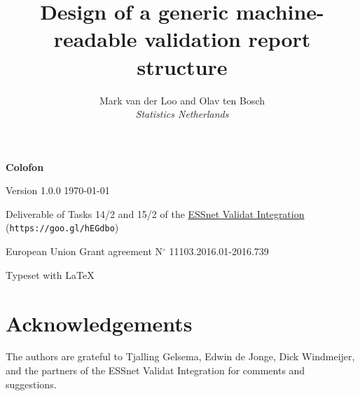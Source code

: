 \documentclass[a4paper, 11pt,titlepage]{article}
\title{Design of a generic machine-readable validation report structure}
\author{Mark van der Loo and Olav ten Bosch\\
\emph{Statistics Netherlands}
}
\date{\version{}\\
\begin{picture}(0,0)
\put(150,350){\texttt{[image: fig/logo\_validat\_integration.png]}}
\end{picture}
}
\newcommand{\version}{Version 1.0.0 \today}
\begin{document}
\maketitle{}

\thispagestyle{empty}
\null
\vfill{}
\begin{description}[noitemsep]
\item \textbf{Colofon}
\item \version{}
\item Deliverable of Tasks 14/2 and 15/2 of the \href{https://ec.europa.eu/eurostat/cros/content/essnet-validat-integration_en}{ESSnet Validat Integration} (\texttt{https://goo.gl/hEGdbo})
\item European Union Grant agreement N$^\circ$ 11103.2016.01-2016.739
\item Typeset with \LaTeX
\end{description}

\newpage

\tableofcontents{}

\newpage














\clearpage{}


\clearpage{}



\clearpage{}
\section*{Acknowledgements}
The authors are grateful to Tjalling Gelsema, Edwin de Jonge, Dick Windmeijer,
and the partners of the ESSnet Validat Integration for comments and suggestions.

\clearpage{}

\end{document}
